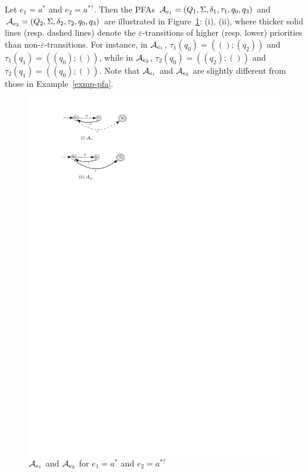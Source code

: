 \begin{example}
Let $e_1 = a^\ast$ and $e_2 = a^{\ast ?}$. Then the PFAs $\mathcal{A}_{e_1} = (Q_1, \Sigma, \delta_1, \tau_1, q_0, q_3)$ and $\mathcal{A}_{e_2} =  (Q_2, \Sigma, \delta_2, \tau_2, q_0, q_3)$ are illustrated in Figure~\ref{fig-retopfa}: (i), (ii), where thicker solid lines (resp. dashed lines) denote the $\varepsilon$-transitions of higher (resp. lower) priorities than non-$\varepsilon$-transitions. For instance, in $\mathcal{A}_{e_1}$, $\tau_1(q_0) = ((); (q_2))$ and $\tau_1(q_1) = ((q_0); ())$, while in $\mathcal{A}_{e_2}$, $\tau_2(q_0) = ((q_2); ())$ and $\tau_2(q_1) = ((q_0); ())$. Note that $\mathcal{A}_{e_1}$ and $\mathcal{A}_{e_2}$ are slightly different from those in Example~\ref{exmp-pfa}.
\begin{figure}[ht]
\centering
\includegraphics[scale=0.8]{retopfa.pdf}
\caption{$\mathcal{A}_{e_1}$ and $\mathcal{A}_{e_2}$ for $e_1= a^\ast$ and $e_2 = a^{\ast?}$}
\label{fig-retopfa}
\end{figure}
\end{example}
 
